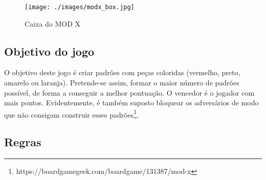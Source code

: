 \documentclass[a4paper]{article}
\begin{document}
\begin{figure}[h!]
	\begin{center}
		\texttt{[image: ./images/modx\_box.jpg]}
		\caption{Caixa do MOD X}
		\label{fig:1}
	\end{center}
\end{figure}

\subsection{Objetivo do jogo}

O objetivo deste jogo é criar padrões com peças coloridas (vermelho, preto, amarelo ou laranja).
Pretende-se assim, formar o maior número de padrões possível, de forma a conseguir a melhor pontuação.
O vencedor é o jogador com mais pontos.
Evidentemente, é também suposto bloquear os adversários de modo que não consigam construir esses padrões\footnote{https://boardgamegeek.com/boardgame/131387/mod-x}.  

\subsection{Regras}
\end{document}
